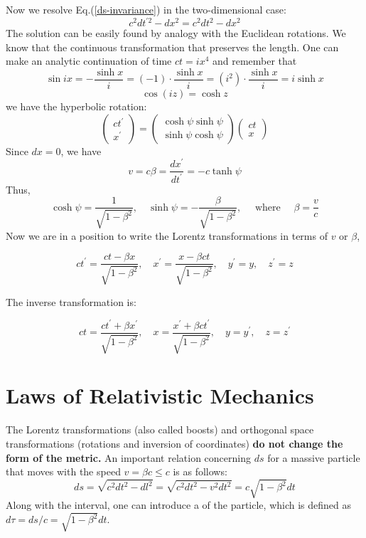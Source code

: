 Now we resolve Eq.(\ref{ds-invariance}) in the two-dimensional case:
$$
c^{2} d t^{\prime 2}-d x^{2}=c^{2} d t^{2}-d x^{2}
$$
The solution can be easily found by analogy with the Euclidean rotations. We know that the continuous transformation that preserves the length. One can make an analytic continuation of time $ct=ix^4$ and remember that 
$$
\sin i x=-\frac{\sinh x}{i}=(-1) \cdot \frac{\sinh x}{i}=\left(i^{2}\right) \cdot \frac{\sinh x}{i}=i \sinh x
$$
$$
\cos (i z)=\cosh z
$$
we have the hyperbolic rotation:
\begin{equation}
\left(\begin{array}{c}
{c t^{\prime}} \\
{x^{\prime}}
\end{array}\right)=\left(\begin{array}{c}
{\cosh \psi \sinh \psi} \\
{\sinh \psi \cosh \psi}
\end{array}\right)\left(\begin{array}{l}
{c t} \\
{x}
\end{array}\right)
\end{equation}
Since $dx=0$, we have
$$
v=c \beta=\frac{d x^{\prime}}{d t^{\prime}}=-c \tanh \psi
$$
Thus,
$$
\cosh \psi=\frac{1}{\sqrt{1-\beta^{2}}}, \quad \sinh \psi=-\frac{\beta}{\sqrt{1-\beta^{2}}}, \quad \text { where } \quad \beta=\frac{v}{c}
$$
Now we are in a position to write the Lorentz transformations in terms of $v$ or $\beta$,
\begin{qt}
    \begin{equation}
c t^{\prime}=\frac{c t-\beta x}{\sqrt{1-\beta^{2}}}, \quad x^{\prime}=\frac{x-\beta c t}{\sqrt{1-\beta^{2}}}, \quad y^{\prime}=y, \quad z^{\prime}=z
\label{lorentz-trans}
\end{equation}
\end{qt}
The inverse transformation is:
\begin{qt}
    \begin{equation}
c t=\frac{c t^{\prime}+\beta x^{\prime}}{\sqrt{1-\beta^{2}}}, \quad x=\frac{x^{\prime}+\beta c t^{\prime}}{\sqrt{1-\beta^{2}}}, \quad y=y^{\prime}, \quad z=z^{\prime}
\label{inverse-lorentz}
\end{equation}
\end{qt}

\section{Laws of Relativistic Mechanics}
The Lorentz transformations (also called boosts) and orthogonal space transformations (rotations and inversion of coordinates) \textbf{do not change the form of the metric.} An important relation concerning $ds$ for a massive particle that moves with the speed $v=\beta c\leq c$ is as follows:
\begin{equation}
d s=\sqrt{c^{2} d t^{2}-d l^{2}}=\sqrt{c^{2} d t^{2}-v^{2} d t^{2}}=c \sqrt{1-\beta^{2}} d t
\end{equation}
Along with the interval, one can introduce a \textbf{} of the particle, which is defined as $d \tau=d s / c=\sqrt{1-\beta^{2}} d t$.

